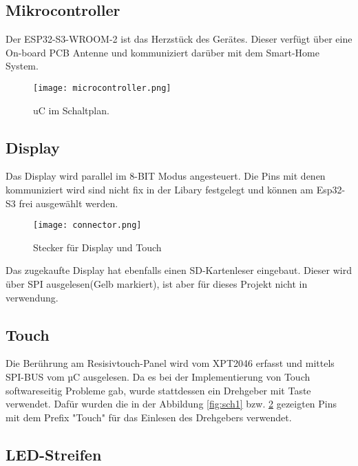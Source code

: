         \subsection{Mikrocontroller}
        Der ESP32-S3-WROOM-2 ist das Herzstück des Gerätes. Dieser verfügt über eine On-board PCB Antenne
        und kommuniziert darüber mit dem Smart-Home System. 

            \begin{figure}[h!]
                \centering
                \texttt{[image: microcontroller.png]}
                \caption{uC im Schaltplan.}
                \label{fig:sch3}

            \end{figure}

        \newpage
        \subsection{Display}
        Das Display wird parallel im 8-BIT Modus angesteuert. Die Pins mit denen 
        kommuniziert wird sind nicht fix in der Libary festgelegt und können am Esp32-S3 
        frei ausgewählt werden. 

            \begin{figure}[h!]
                \centering
                \texttt{[image: connector.png]}
                \caption{Stecker für Display und Touch}
                \label{fig:sch4}

            \end{figure}

        Das zugekaufte Display hat ebenfalls einen SD-Kartenleser eingebaut. Dieser wird 
        über SPI ausgelesen(Gelb markiert), ist aber für dieses Projekt nicht in verwendung. 

        \newpage
        \subsection{Touch}
        Die Berührung am Resisivtouch-Panel wird vom XPT2046 erfasst und mittels 
        SPI-BUS vom µC ausgelesen. Da es bei der Implementierung von Touch softwareseitig
        Probleme gab, wurde stattdessen ein Drehgeber mit Taste verwendet.
        Dafür wurden die in der Abbildung \ref{fig:sch1} bzw. \ref{fig:sch4} gezeigten Pins mit 
        dem Prefix "Touch" für das Einlesen des Drehgebers verwendet.

        \subsection{LED-Streifen}

